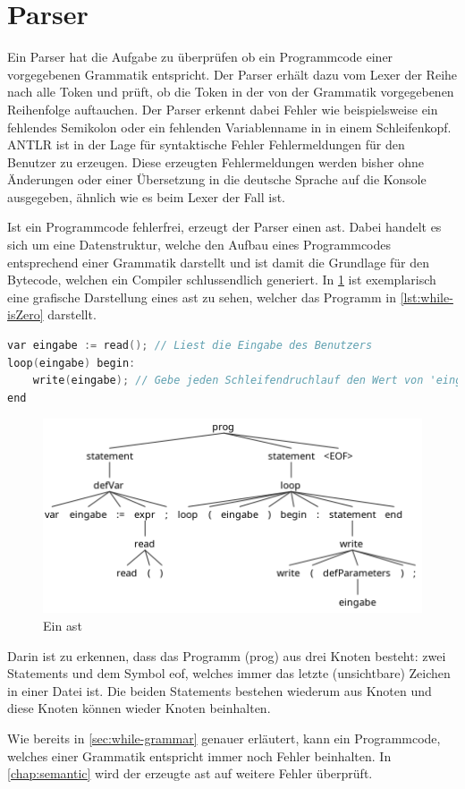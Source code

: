 \section{Parser} \label{sec:parser}
Ein Parser hat die Aufgabe zu überprüfen ob ein Programmcode einer vorgegebenen Grammatik entspricht. Der Parser erhält dazu vom Lexer der Reihe nach alle Token und prüft, ob die Token in der von der Grammatik vorgegebenen Reihenfolge auftauchen. Der Parser erkennt dabei Fehler wie beispielsweise ein fehlendes Semikolon oder ein fehlenden Variablenname in in einem Schleifenkopf. ANTLR ist in der Lage für syntaktische Fehler Fehlermeldungen für den Benutzer zu erzeugen. Diese erzeugten Fehlermeldungen werden bisher ohne Änderungen oder einer Übersetzung in die deutsche Sprache auf die Konsole ausgegeben, ähnlich wie es beim Lexer der Fall ist.  

Ist ein Programmcode fehlerfrei, erzeugt der Parser einen \ac{ast}. Dabei handelt es sich um eine Datenstruktur, welche den Aufbau eines Programmcodes entsprechend einer Grammatik darstellt und ist damit die Grundlage für den Bytecode, welchen ein Compiler schlussendlich generiert. In \cref{pic:isZeroAST} ist exemplarisch eine grafische Darstellung eines \ac{ast} zu sehen, welcher das Programm in \cref{lst:while-isZero} darstellt. 

\begin{lstlisting}[language=c, caption=Prueft ob ein Wert 0 ist, label={lst:while-isZero}]
var eingabe := read(); // Liest die Eingabe des Benutzers
loop(eingabe) begin:
	write(eingabe); // Gebe jeden Schleifendruchlauf den Wert von 'eingabe' aus
end
\end{lstlisting}

\begin{figure}[h!]
	\centering
	\includegraphics[width=12cm]{content/pictures/ast.png}
	\caption{Ein \acl{ast}}
	\label{pic:isZeroAST}
\end{figure}

Darin ist zu erkennen, dass das Programm (prog) aus drei Knoten besteht: zwei Statements und dem Symbol \ac{eof}, welches immer das letzte (unsichtbare) Zeichen in einer Datei ist. Die beiden Statements bestehen wiederum aus Knoten und diese Knoten können wieder Knoten beinhalten. 

Wie bereits in \cref{sec:while-grammar} genauer erläutert, kann ein Programmcode, welches einer Grammatik entspricht immer noch Fehler beinhalten. In \cref{chap:semantic} wird der erzeugte \ac{ast} auf weitere Fehler überprüft.